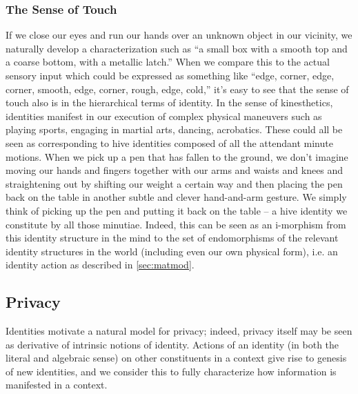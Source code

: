\documentclass[pra,twocolumn,groupedaddress,10pt]{revtex4}
\theoremstyle{definition}
\begin{document}
\subsubsection{The Sense of Touch} \label{sec:sentou}

If we close our eyes and run our hands over an unknown object in our vicinity, we naturally develop a characterization such as ``a small box with a smooth top and a coarse bottom, with a metallic latch.'' When we compare this to the actual sensory input which could be expressed as something like ``edge, corner, edge, corner, smooth, edge, corner, rough, edge, cold,'' it's easy to see that the sense of touch also is in the hierarchical terms of identity. In the sense of kinesthetics, identities manifest in our execution of complex physical maneuvers such as playing sports, engaging in martial arts, dancing, acrobatics. These could all be seen as corresponding to hive identities composed of all the attendant minute motions. When we pick up a pen that has fallen to the ground, we don't imagine moving our hands and fingers together with our arms and waists and knees and straightening out by shifting our weight a certain way and then placing the pen back on the table in another subtle and clever hand-and-arm gesture. We simply think of picking up the pen and putting it back on the table -- a hive identity we constitute by all those minutiae. Indeed, this can be seen as an i-morphism from this identity structure in the mind to the set of endomorphisms of the relevant identity structures in the world (including even our own physical form), i.e. an identity action as described in \autoref{sec:matmod}.


\subsection{Privacy} \label{sec:privacy}

Identities motivate a natural model for privacy; indeed, privacy itself may be seen as derivative of intrinsic notions of identity. Actions of an identity (in both the literal and algebraic sense) on other constituents in a context give rise to genesis of new identities, and we consider this to fully characterize how information is manifested in a context.
\end{document}
